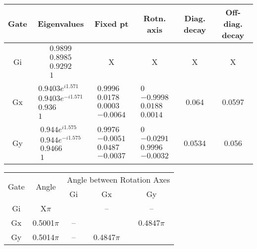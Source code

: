 {\begin{table}[h]
\begin{center}
\begin{tabular}[l]{|c|c|c|c|c|c|}
\hline
Gate & Eigenvalues & Fixed pt & Rotn. axis & Diag. decay & Off-diag. decay \\ \hline
Gi & $ \begin{array}{c}
0.9899 \\ 
0.8985 \\ 
0.9292 \\ 
1
 \end{array} $
 & X & X & X & X \\ \hline
Gx & $ \begin{array}{c}
0.9403e^{i1.571} \\ 
0.9403e^{-i1.571} \\ 
0.936 \\ 
1
 \end{array} $
 & $ \begin{array}{c}
0.9996 \\ 
0.0178 \\ 
0.0003 \\ 
-0.0064
 \end{array} $
 & $ \begin{array}{c}
0 \\ 
-0.9998 \\ 
0.0188 \\ 
0.0014
 \end{array} $
 & 0.064 & 0.0597 \\ \hline
Gy & $ \begin{array}{c}
0.944e^{i1.575} \\ 
0.944e^{-i1.575} \\ 
0.9466 \\ 
1
 \end{array} $
 & $ \begin{array}{c}
0.9976 \\ 
-0.0051 \\ 
0.0487 \\ 
-0.0037
 \end{array} $
 & $ \begin{array}{c}
0 \\ 
-0.0291 \\ 
0.9996 \\ 
-0.0032
 \end{array} $
 & 0.0534 & 0.056 \\ \hline
\end{tabular}

\vspace{2em}
\begin{tabular}[l]{|c|c|c|c|c|}
\hline
\multirow{2}{*}{Gate} & \multirow{2}{*}{Angle} & \multicolumn{3}{c|}{Angle between Rotation Axes} \\ \cline{3-5}
 & & Gi & Gx & Gy \\ \hline
Gi & X$\pi$ &  & -- & -- \\ \hline
Gx & 0.5001$\pi$ & -- &  & 0.4847$\pi$ \\ \hline
Gy & 0.5014$\pi$ & -- & 0.4847$\pi$ &  \\ \hline
\end{tabular}


\end{center}
\end{table}}
